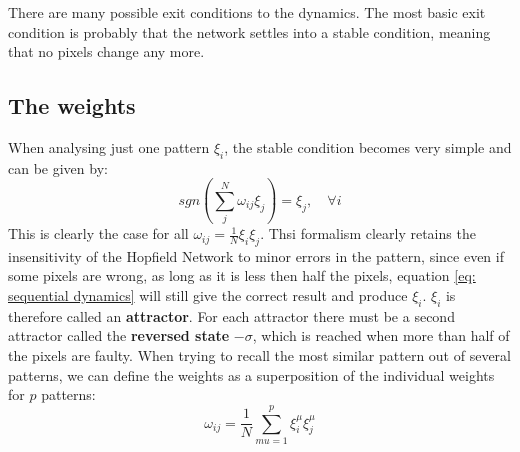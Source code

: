 There are many possible exit conditions to the dynamics. The most basic exit condition is probably that the network settles into a stable condition, meaning that no pixels change any more. 

\subsection{The weights}
When analysing just one pattern $\xi_i$, the stable condition becomes very simple and can be given by:
\begin{equation}
sgn\left( \sum_j^N \omega_{ij} \xi_j \right) = \xi_j, \quad	\forall i
\end{equation}
This is clearly the case for all $\omega_{ij}=\frac{1}{N} \xi_i \xi_j$. Thsi formalism clearly retains the insensitivity of the Hopfield Network to minor errors in the pattern, since even if some pixels are wrong, as long as it is less then half the pixels, equation \ref{eq: sequential dynamics} will still give the correct result and produce $\xi_i$. $\xi_i$ is therefore called an \textbf{attractor}. For each attractor there must be a second attractor called the \textbf{reversed state} $-\sigma$, which is reached when more than half of the pixels are faulty. 
When trying to recall the most similar pattern out of several patterns, we can define the weights as a superposition of the individual weights for $p$ patterns:
\begin{equation}
\omega_{ij}=\frac{1}{N} \sum_{mu=1}^p \xi_i^\mu \xi_j^\mu
\end{equation}

